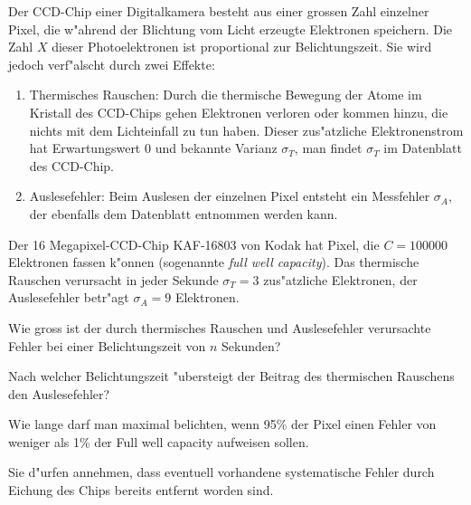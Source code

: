 Der CCD-Chip einer Digitalkamera besteht aus einer grossen Zahl einzelner
Pixel, die w"ahrend der Blichtung vom Licht erzeugte Elektronen speichern.
Die Zahl $X$ dieser Photoelektronen ist proportional zur Belichtungszeit.
Sie wird jedoch verf"alscht durch zwei Effekte:
\begin{enumerate}
\item
Thermisches Rauschen: Durch die thermische Bewegung der Atome
im Kristall des CCD-Chips gehen Elektronen verloren oder kommen hinzu,
die nichts mit dem Lichteinfall zu tun haben. Dieser zus"atzliche
Elektronenstrom hat Erwartungswert $0$ und bekannte Varianz $\sigma_T$,
man findet $\sigma_T$ im Datenblatt des CCD-Chip.
\item
Auslesefehler: Beim Auslesen der einzelnen Pixel entsteht ein Messfehler
$\sigma_A$, der ebenfalls dem Datenblatt entnommen werden kann.
\end{enumerate}
Der 16 Megapixel-CCD-Chip KAF-16803 von Kodak hat Pixel, die $C = 100000$
Elektronen fassen k"onnen (sogenannte {\it full well capacity}).
Das thermische Rauschen verursacht in jeder
Sekunde $\sigma_T = 3$ zus"atzliche Elektronen, der Auslesefehler
betr"agt $\sigma_A=9$ Elektronen.
\begin{teilaufgaben}
\item Wie gross ist der durch thermisches Rauschen und Auslesefehler
verursachte Fehler bei einer Belichtungszeit von $n$ Sekunden?
\item Nach welcher Belichtungszeit "ubersteigt der Beitrag des
thermischen Rauschens den Auslesefehler?
\item Wie lange darf man maximal belichten, wenn 95\% der Pixel einen Fehler
von weniger als 1\% der Full well capacity aufweisen sollen.
\end{teilaufgaben}

\begin{hinweis}
Sie d"urfen annehmen, dass eventuell vorhandene systematische
Fehler durch Eichung des Chips bereits entfernt worden sind.
\end{hinweis}

